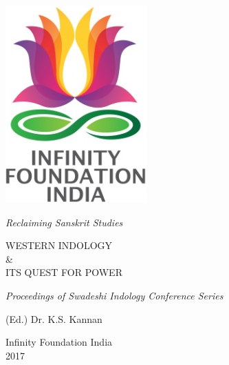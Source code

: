 \thispagestyle{empty}
\begin{center}
\includegraphics[scale=0.3]{figures/logo.png}
\bigskip

{\fontsize{10}{14}\selectfont\sl
Reclaiming Sanskrit Studies}
\end{center}
\bigskip

\begin{center}
{\fontsize{20}{24}\selectfont WESTERN INDOLOGY}\\[6pt]
{\fontsize{15}{24}\selectfont  \& }\\[6pt]
{\fontsize{15}{24}\selectfont  ITS QUEST FOR POWER}
\bigskip

{\sl\small Proceedings of Swadeshi Indology Conference Series}
\bigskip
\bigskip

{\fontsize{14}{18}\selectfont 
(Ed.) Dr. K.S. Kannan\par
}
\vfill

{\fontsize{12}{14}\selectfont
Infinity Foundation India\\[4pt]
2017}
\end{center}




